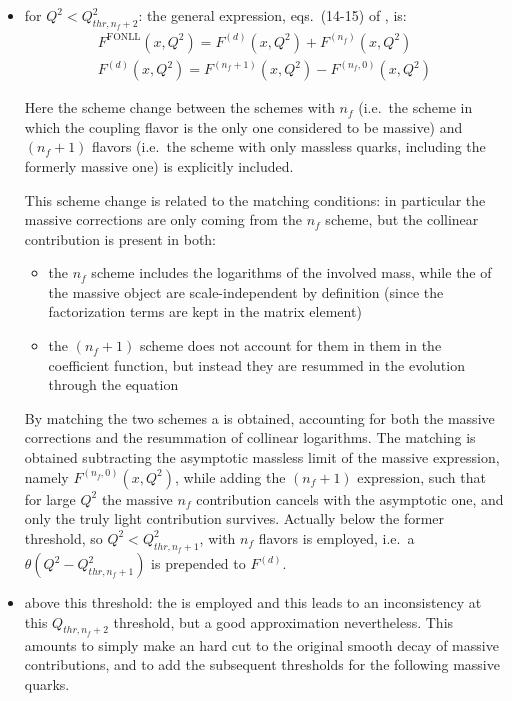 \begin{itemize}
  \item for $Q^2 < Q_{thr,n_f+2}^2$: the general expression,
    eqs.~(14-15) of \cite{Forte:2010ta}, is:
    \begin{align}
        F^{\text{FONLL}}(x, Q^2) = F^{(d)}(x, Q^2) + F^{(n_f)}(x, Q^2)\\
        F^{(d)}(x, Q^2) = F^{(n_f + 1)}(x, Q^2) - F^{(n_f, 0)}(x, Q^2)
        \label{eq:dis/fonll}
    \end{align}

    Here the scheme change between the schemes with $n_f$ (i.e.\ the \ffns
    scheme in which the coupling flavor is the only one considered to be
    massive) and $(n_f + 1)$ flavors (i.e.\ the \ffns scheme with only massless
    quarks, including the formerly massive one) is explicitly included.

    This scheme change is related to the \dglap matching conditions: in
    particular the massive corrections are only coming from the $n_f$
    scheme, but the collinear contribution is present in both:
    \begin{itemize}
      \item the $n_f$ scheme includes the logarithms of the involved mass,
          while the \pdf of the massive object are scale-independent by definition
          (since the factorization terms are kept in the matrix element)
      \item the $(n_f + 1)$ scheme does not account for them in them in the coefficient
          function, but instead they are resummed in the \pdf evolution through the
          \dglap equation
    \end{itemize}

    By matching the two schemes a \gmvfns is obtained, accounting for both the
    massive corrections and the resummation of collinear logarithms.
    The matching is obtained subtracting the asymptotic massless limit of the
    massive expression, namely $F^{(n_f, 0)}(x, Q^2)$, while adding the
    $(n_f + 1)$ expression, such that for large $Q^2$ the massive
    $n_f$ contribution cancels with the asymptotic one, and only the truly
    light contribution survives.
    Actually below the former threshold, so $Q^2 < Q_{thr,n_f+1}^2$, \fns
    with $n_f$ flavors is employed, i.e.\ a $\theta(Q^2 - Q_{thr,n_f+1}^2)$ is
    prepended to $F^{(d)}$.

  \item above this threshold: the \zmvfns is employed and this leads
    to an inconsistency at this $Q_{thr,n_f+2}$ threshold, but a good
    approximation nevertheless.
    This amounts to simply make an hard cut to the original smooth decay of
    massive contributions, and to add the subsequent thresholds for the following
    massive quarks.
\end{itemize}

